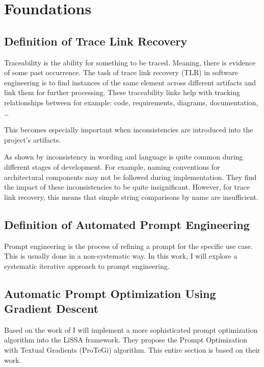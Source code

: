 \chapter{Foundations}

\section{Definition of Trace Link Recovery}
Traceability is the ability for something to be traced. Meaning, there is evidence of some past occurrence. %
The task of trace link recovery (TLR) in software engineering is to find instances of the same element across different artifacts and link them for further processing. These traceability links help with tracking relationships between for example: code, requirements, diagrams, documentation, \dots

This becomes especially important when inconsistencies are introduced into the project's artifacts. 

As shown by  inconsistency in wording and language is quite common during different stages of development. For example, naming conventions for architectural components may not be followed during implementation. They find the impact of these inconsistencies to be quite insignificant. However, for trace link recovery, this means that simple string comparisons by name are insufficient.



\section{Definition of Automated Prompt Engineering}
Prompt engineering is the process of refining a prompt for the specific use case. This is usually done in a non-systematic way. In this work, I will explore a systematic iterative approach to prompt engineering.

\section{Automatic Prompt Optimization Using Gradient Descent}
\label{sec:gradient_descent}
Based on the work of  I will implement a more sophisticated prompt optimization algorithm into the LiSSA framework. They propose the Prompt Optimization with Textual Gradients (ProTeGi) algorithm. This entire section is based on their work.

